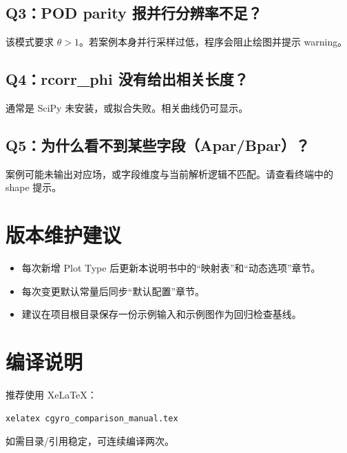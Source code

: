 \documentclass[11pt,a4paper]{ctexart}
\begin{document}
\subsection*{Q3：POD parity 报并行分辨率不足？}
该模式要求 \(\theta>1\)。若案例本身并行采样过低，程序会阻止绘图并提示 warning。

\subsection*{Q4：rcorr\_phi 没有给出相关长度？}
通常是 SciPy 未安装，或拟合失败。相关曲线仍可显示。

\subsection*{Q5：为什么看不到某些字段（Apar/Bpar）？}
案例可能未输出对应场，或字段维度与当前解析逻辑不匹配。请查看终端中的 shape 提示。

\section{版本维护建议}
\begin{itemize}
  \item 每次新增 Plot Type 后更新本说明书中的“映射表”和“动态选项”章节。
  \item 每次变更默认常量后同步“默认配置”章节。
  \item 建议在项目根目录保存一份示例输入和示例图作为回归检查基线。
\end{itemize}

\section{编译说明}
推荐使用 XeLaTeX：
\begin{lstlisting}
xelatex cgyro_comparison_manual.tex
\end{lstlisting}
如需目录/引用稳定，可连续编译两次。
\end{document}
